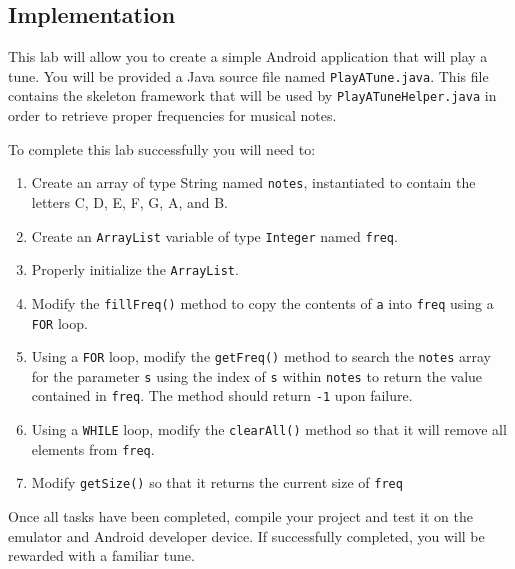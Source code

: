 \subsection{Implementation}

This lab will allow you to create a simple Android application that will play a tune.  You will be provided a Java source file named {\tt PlayATune.java}. This file contains the skeleton framework that will be used by {\tt PlayATuneHelper.java} in order to retrieve proper frequencies for musical notes.

To complete this lab successfully you will need to:

\begin{enumerate}
\item Create an array of type String named {\tt notes}, instantiated to contain the letters C, D, E, F, G, A, and B.
\item Create an {\tt ArrayList} variable of type {\tt Integer} named {\tt freq}.
\item Properly initialize the {\tt ArrayList}.
\item Modify the {\tt fillFreq()} method to copy the contents of {\tt a} into {\tt freq} using a {\tt FOR} loop.
\item Using a {\tt FOR} loop, modify the {\tt getFreq()} method to search the {\tt notes} array for the parameter {\tt s} using the index of {\tt s} within {\tt notes} to return the value contained in {\tt freq}. The method should return {\tt -1} upon failure.
\item Using a {\tt WHILE} loop, modify the {\tt clearAll()} method so that it will remove all elements from {\tt freq}.
\item Modify {\tt getSize()} so that it returns the current size of {\tt freq}
\end{enumerate}

Once all tasks have been completed, compile your project and test it on the emulator and Android developer device. If successfully completed, you will be rewarded with a familiar tune.